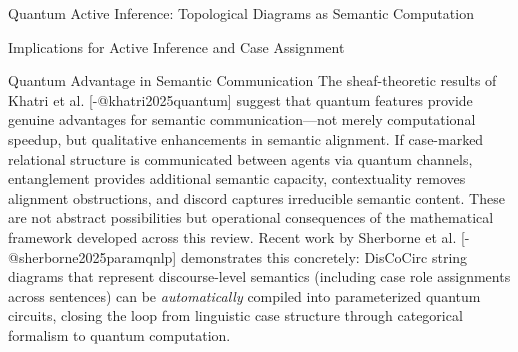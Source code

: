 \documentclass[
  ignorenonframetext,
]{beamer}
\begin{document}
\begin{frame}{Quantum Active Inference: Topological Diagrams as Semantic
Computation}
\begin{block}{Implications for Active Inference and Case Assignment}
\begin{block}{Quantum Advantage in Semantic Communication}
\protect{}\label{quantum-advantage-in-semantic-communication}
The sheaf-theoretic results of Khatri et al. {[}-@khatri2025quantum{]}
suggest that quantum features provide genuine advantages for semantic
communication---not merely computational speedup, but qualitative
enhancements in semantic alignment. If case-marked relational structure
is communicated between agents via quantum channels, entanglement
provides additional semantic capacity, contextuality removes alignment
obstructions, and discord captures irreducible semantic content. These
are not abstract possibilities but operational consequences of the
mathematical framework developed across this review. Recent work by
Sherborne et al. {[}-@sherborne2025paramqnlp{]} demonstrates this
concretely: DisCoCirc string diagrams that represent discourse-level
semantics (including case role assignments across sentences) can be
\emph{automatically} compiled into parameterized quantum circuits,
closing the loop from linguistic case structure through categorical
formalism to quantum computation.
\end{block}
\end{block}
\end{frame}
\end{document}
